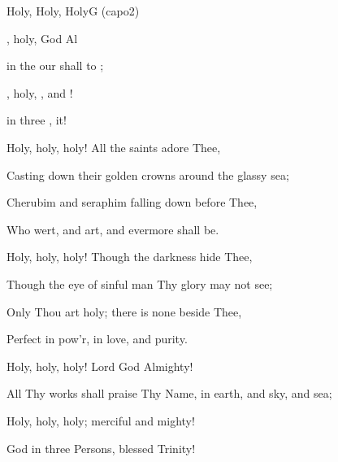 \begin{song}{Holy, Holy, Holy}{G (capo2)}
    {\SBPubDom}
    {}
    {}
    {\NotCCLIed}

\begin{SBVerse}
, holy,   God Al 

 in the  our  shall  to ; 

, holy, ,  and ! 

 in three ,  it!
\end{SBVerse}

\begin{SBVerse}
Holy, holy, holy! All the saints adore Thee, 

Casting down their golden crowns around the glassy sea; 

Cherubim and seraphim falling down before Thee, 

Who wert, and art, and evermore shall be.
\end{SBVerse}

\begin{SBVerse}
Holy, holy, holy! Though the darkness hide Thee, 

Though the eye of sinful man Thy glory may not see; 

Only Thou art holy; there is none beside Thee, 

Perfect in pow’r, in love, and purity.
\end{SBVerse}

\begin{SBVerse}
Holy, holy, holy! Lord God Almighty! 

All Thy works shall praise Thy Name, in earth, and sky, and sea; 

Holy, holy, holy; merciful and mighty! 

God in three Persons, blessed Trinity!
\end{SBVerse}
\end{song}
